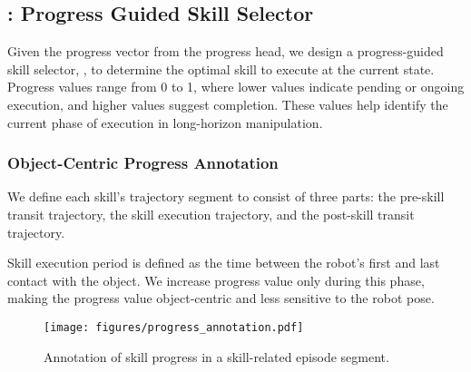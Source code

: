 \subsection{\progss: Progress Guided Skill Selector}\label{sec:progss}

Given the progress vector from the progress head, we design a progress-guided skill selector, \progss, to determine the optimal skill to execute at the current state. Progress values range from 0 to 1, where lower values indicate pending or ongoing execution, and higher values suggest completion. These values help identify the current phase of execution in long-horizon manipulation.


\subsubsection{Object-Centric Progress Annotation}
We define each skill's trajectory segment to consist of three parts: the pre-skill transit trajectory, the skill execution trajectory, and the post-skill transit trajectory.

Skill execution period is defined as the time between the robot's first and last contact with the object. We increase progress value only during this phase, making the progress value object-centric and less sensitive to the robot pose.

\begin{wrapfigure}{r}{0.25\textwidth}  %
    \centering
    \texttt{[image: figures/progress\_annotation.pdf]}
    \vspace{-7mm}
    \caption{Annotation of skill progress in a skill-related episode segment.}
    \label{fig:annotation}
\end{wrapfigure}

